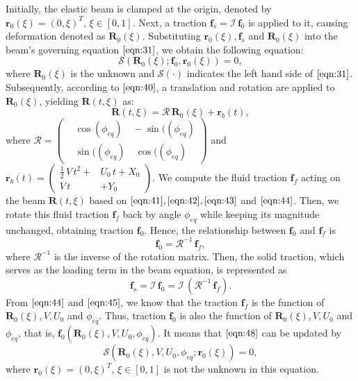 \documentclass[12pt,MSc,twoside]{muthesis_2020}
\begin{document}
Initially, the elastic beam is clamped at the origin, denoted by $\textbf{r}_0(\xi)=(0,\xi)^T,\,\xi\in [0,1]$. Next, a traction $\mathbf{f}_s=\mathcal{I}\,\textbf{f}_0$  is applied to it, causing deformation denoted as $\textbf{R}_0(\xi)$. Substituting 
$\textbf{r}_0(\xi), \textbf{f}_s$ and $\textbf{R}_0(\xi)$ into the beam's governing equation $\eqref{eqn:31}$, we obtain the following equation:
\begin{equation}
	\label{eqn:48}
	\bm{\mathcal{S}}\left(\textbf{R}_0(\xi);\textbf{f}_0,\textbf{r}_0(\xi)\right)=0,
\end{equation}
where $\textbf{R}_0(\xi)$ is the unknown and $\bm{\mathcal{S}}(\cdot)$ indicates the left hand side of $\eqref{eqn:31}$.
Subsequently, according to $\eqref{eqn:40}$, a translation and rotation are applied to 
$\textbf{R}_0(\xi)$, yielding $\textbf{R}(t,\xi)$ as:
\begin{equation}
	\label{eqn:49}
	\textbf{R}(t,\xi)=\bm{\mathcal{R}}\,\textbf{R}_0(\xi)+\textbf{r}_b(t),
\end{equation}
where $\bm{\mathcal{R}}=\left(\begin{aligned}
	&\cos(\phi_{eq})\quad -\sin((\phi_{eq}) \\
	&\sin((\phi_{eq})\quad \cos((\phi_{eq})
\end{aligned}\right) $ and $\textbf{r}_b(t)=\left(\begin{aligned}
\frac{1}{2}\,V\,t^2+&U_0\,t+X_0\\
V\,t&+Y_0
\end{aligned}\right)$. We compute the fluid traction $\textbf{f}_f$ acting on the beam $\textbf{R}(t,\xi)$ based on $\eqref{eqn:41},\eqref{eqn:42},\eqref{eqn:43}$ and $\eqref{eqn:44}$. Then, we rotate this fluid traction $\textbf{f}_f$ back by angle $\phi_{eq}$ while keeping its magnitude unchanged, obtaining traction $\textbf{f}_0$. Hence, the relationship between $\textbf{f}_0$ and $\textbf{f}_f$ is 
\begin{equation}
	\label{eqn:50}
	\textbf{f}_0=\bm{\mathcal{R}}^{-1}\,\textbf{f}_f,
\end{equation}
where $\bm{\mathcal{R}}^{-1}$ is the inverse of the rotation matrix. Then, the solid traction, which serves as the loading term in the beam equation, is represented as 
\begin{equation}
	\label{eqn:67}
	\textbf{f}_s=\mathcal{I}\,\textbf{f}_0=\mathcal{I}\,\left(\bm{\mathcal{R}}^{-1}\,\textbf{f}_f\right).
\end{equation}
From $\eqref{eqn:44}$ and $\eqref{eqn:45}$, we know that the traction $\textbf{f}_f$ is the function of $\textbf{R}_0(\xi), V, U_0$ and $\phi_{eq}$. Thus, traction $\textbf{f}_0$ is also the function of  $\textbf{R}_0(\xi), V, U_0$ and $\phi_{eq}$, that is, $\textbf{f}_0\left(\textbf{R}_0(\xi), V, U_0,\phi_{eq}\right)$. It means that $\eqref{eqn:48}$ can be updated by
\begin{equation}
	\label{eqn:51}
	\bm{\mathcal{S}}\left(\textbf{R}_0(\xi), V, U_0,\phi_{eq};\textbf{r}_0(\xi)\right)=0,
\end{equation}
where $\textbf{r}_0(\xi)=(0,\xi)^T,\,\xi\in [0,1]$ is not the unknown in this equation.
\end{document}
